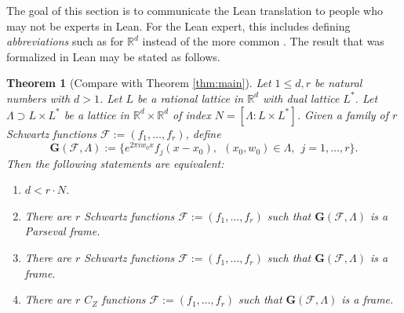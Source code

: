 \documentclass[reqno,a4paper,12pt]{amsart}
\numberwithin{equation}{section}
\newtheorem*{theorem*}{Theorem}
\newcommand\1{\mathds{1}}
\begin{document}
The goal of this section is to communicate the Lean translation to people who may not be experts in Lean. For the Lean expert, this includes defining \emph{abbreviations}  such as  for $\mathbb R^d$ instead of the more common . The result that was formalized in Lean may be stated as follows. 
\begin{theorem*}[Compare with Theorem \ref{thm:main}]
    Let $1\le d,r$ be natural numbers with $d>1$. Let $L$ be a rational lattice in $\mathbb R^d$ with dual lattice $L^*$. Let $\Lambda\supset L\times L^{*}$ be a lattice in $\mathbb R^d \times \mathbb R^d$ of index $N = [\Lambda : L\times L^*]$. Given a family of $r$ Schwartz functions $\mathcal F :=(f_1, \dots, f_r)$, define 
    $$
    \mathbf G(\mathcal F, \Lambda):= 
    \{
    e^{2\pi i w_0 x} f_j(x-x_0), \ \  (x_0, w_0) \in \Lambda,
    \ \ j=1,\dots, r
    \}.
    $$
    Then the following statements are equivalent:
    \begin{enumerate}
        \item $d<r\cdot N$.
        \item There are $r$ Schwartz functions $\mathcal F:=(f_1, \dots, f_r)$ such that $\mathbf G(\mathcal F, \Lambda)$ is a Parseval frame.
        \item There are $r$ Schwartz functions $\mathcal F:=(f_1, \dots, f_r)$ such that $\mathbf G(\mathcal F, \Lambda)$ is a frame.
        \item There are $r$ $C_Z$ functions $\mathcal F:=(f_1, \dots, f_r)$ such that $ \mathbf G(\mathcal F, \Lambda)$ is a frame.
    \end{enumerate}
\end{theorem*}
\end{document}
